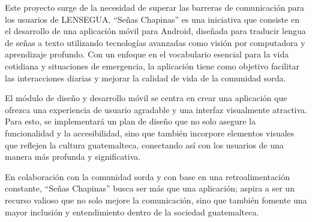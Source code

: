 Este proyecto surge de la necesidad de superar las barreras de comunicación para los usuarios de LENSEGUA. ``Señas Chapinas'' es una iniciativa que consiste en el desarrollo de una aplicación móvil para Android, diseñada para traducir lengua de señas a texto utilizando tecnologías avanzadas como visión por computadora y aprendizaje profundo. Con un enfoque en el vocabulario esencial para la vida cotidiana y situaciones de emergencia, la aplicación tiene como objetivo facilitar las interacciones diarias y mejorar la calidad de vida de la comunidad sorda. 

El módulo de diseño y desarrollo móvil se centra en crear una aplicación que ofrezca una experiencia de usuario agradable y una interfaz visualmente atractiva. Para esto, se implementará un plan de diseño que no solo asegure la funcionalidad y la accesibilidad, sino que también incorpore elementos visuales que reflejen la cultura guatemalteca, conectando así con los usuarios de una manera más profunda y significativa.

En colaboración con la comunidad sorda y con base en una retroalimentación constante, ``Señas Chapinas'' busca ser más que una aplicación; aspira a ser un recurso valioso que no solo mejore la comunicación, sino que también fomente una mayor inclusión y entendimiento dentro de la sociedad guatemalteca.
